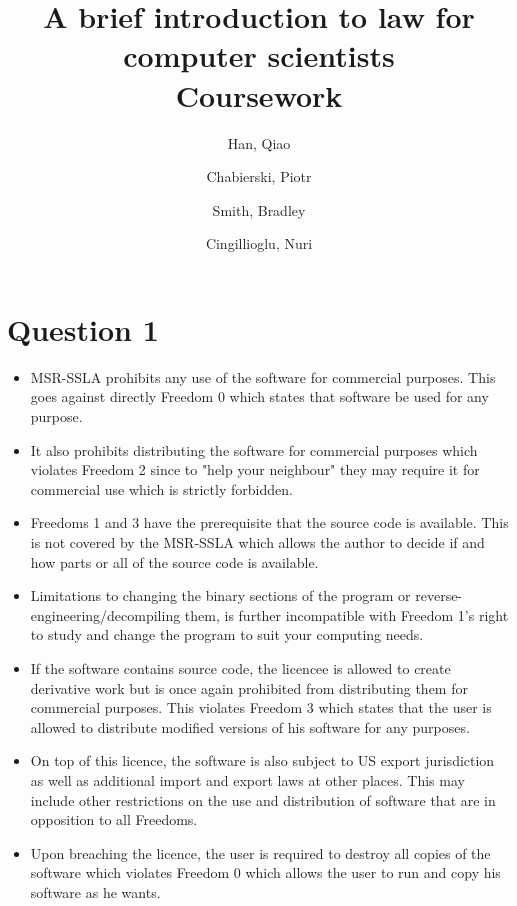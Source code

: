 \documentclass[10pt,a4paper]{article}
\begin{document}
\title{A brief introduction to law for computer
scientists \\
Coursework}
\author{
  Han, Qiao\\
  \and
  Chabierski, Piotr\\
  \and
  Smith, Bradley\\
  \and
  Cingillioglu, Nuri\\
}

\maketitle

\section*{Question 1}
\begin{itemize}
\item MSR-SSLA prohibits any use of the software for commercial purposes. This goes against directly Freedom 0 which states that software be used for any purpose.
\item It also prohibits distributing the software for commercial purposes which violates Freedom 2 since to "help your neighbour" they may require it for commercial use which is strictly forbidden.
\item Freedoms 1 and 3 have the prerequisite that the source code is available. This is not covered by the MSR-SSLA which allows the author to decide if and how parts or all of the source code is available.
\item Limitations to changing the binary sections of the program or reverse-engineering/decompiling them, is further incompatible with Freedom 1's right to study and change the program to suit your computing needs.
\item If the software contains source code, the licencee is allowed to create derivative work but is once again prohibited from distributing them for commercial purposes. This violates Freedom 3 which states that the user is allowed to distribute modified versions of his software for any purposes.
\item On top of this licence, the software is also subject to US export jurisdiction as well as additional import and export laws at other places. This may include other restrictions on the use and distribution of software that are in opposition to all Freedoms.
\item Upon breaching the licence, the user is required to destroy all copies of the software which violates Freedom 0 which allows the user to run and copy his software as he wants.
\end{itemize}
\end{document}
